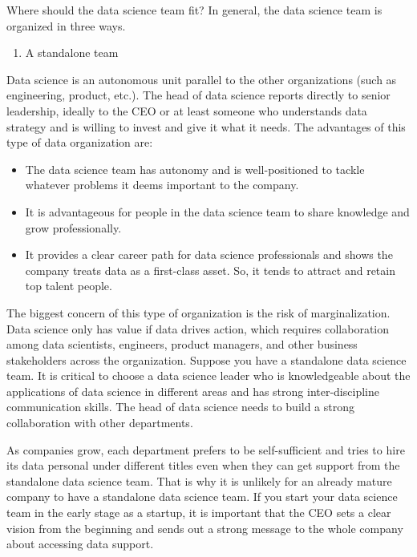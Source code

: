 \documentclass[
  12pt,
]{krantz}
\providecommand{\tightlist}{%
  \setlength{\itemsep}{0pt}\setlength{\parskip}{0pt}}
\begin{document}
Where should the data science team fit? In general, the data science team is organized in three ways.

\begin{enumerate}
\def\labelenumi{(\arabic{enumi})}
\tightlist
\item
  A standalone team
\end{enumerate}

Data science is an autonomous unit parallel to the other organizations (such as engineering, product, etc.). The head of data science reports directly to senior leadership, ideally to the CEO or at least someone who understands data strategy and is willing to invest and give it what it needs. The advantages of this type of data organization are:

\begin{itemize}
\tightlist
\item
  The data science team has autonomy and is well-positioned to tackle whatever problems it deems important to the company.
\item
  It is advantageous for people in the data science team to share knowledge and grow professionally.
\item
  It provides a clear career path for data science professionals and shows the company treats data as a first-class asset. So, it tends to attract and retain top talent people.
\end{itemize}

The biggest concern of this type of organization is the risk of marginalization. Data science only has value if data drives action, which requires collaboration among data scientists, engineers, product managers, and other business stakeholders across the organization. Suppose you have a standalone data science team. It is critical to choose a data science leader who is knowledgeable about the applications of data science in different areas and has strong inter-discipline communication skills. The head of data science needs to build a strong collaboration with other departments.

As companies grow, each department prefers to be self-sufficient and tries to hire its data personal under different titles even when they can get support from the standalone data science team. That is why it is unlikely for an already mature company to have a standalone data science team. If you start your data science team in the early stage as a startup, it is important that the CEO sets a clear vision from the beginning and sends out a strong message to the whole company about accessing data support.
\end{document}
